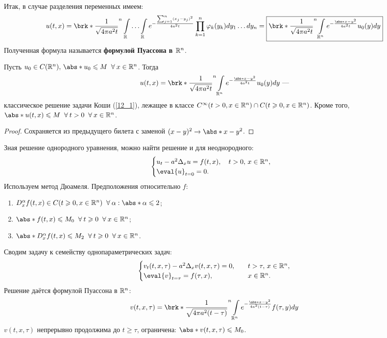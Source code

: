 Итак, в случае разделения переменных имеем:
\begin{equation}
u(t,x) = \brk*{\dfrac{1}{\sqrt{4\pi a^2t}}}^n \int\limits_\R\ldots\int\limits_\R e^{-\frac{\sum_{j=1}^n (x_j - y_j)^2}{4a^2t}} \prod_{k=1}^n \varphi_k(y_k) dy_1\ldots dy_n = \boxed{\brk*{\dfrac{1}{\sqrt{4\pi a^2 t}}}^n \int\limits_{\R^n} e^{-\frac{\abs*{x-y}^2}{4a^2t}} u_0(y)dy}
\end{equation}
Полученная формула называется {\bf формулой Пуассона в $\mathbb{R}^n$}.
\begin{theorem}
	Пусть $u_0 \in C(\R^n), \, \abs*{u_0} \leqslant M \Forall x \in \R^n$. Тогда 
    \begin{equation*}
    	u(t,x) = \brk*{\dfrac{1}{\sqrt{4\pi a^2 t}}}^n \int\limits_{\R^n} e^{-\frac{\abs*{x-y}^2}{4a^2t}} u_0(y)dy \text{ ---}
    \end{equation*}
    классическое решение задачи Коши (\ref{12_1}), лежащее в классе $C^\infty(t>0, x \in \mathbb{R}^n) \cap C(t \geqslant 0, x \in \mathbb{R}^n)$. Кроме того,~$\abs*{u(t,x)} \leqslant M \Forall t > 0 \Forall x \in \R^n$.
\end{theorem}
\begin{proof}
	Сохраняется из предыдущего билета с заменой $(x-y)^2 \to \abs*{x-y}^2$.
\end{proof}
\bigskip
Зная решение однородного уравнения, можно найти решение и для неоднородного:
\begin{equation}
	\begin{cases}
    	u_t - a^2\Delta_xu = f(t,x), \quad t > 0, \, x \in \R^n, \\
        \eval{u}_{t=0} = 0.
    \end{cases}
\end{equation}
Используем метод Дюамеля. Предположения относительно $f$:
\begin{enumerate}
	\item $D_x^\alpha f(t,x) \in C(t \geqslant 0, x \in \R^n) \Forall \alpha: \abs*{\alpha} \leqslant 2$;
    \item $\abs*{f(t,x)} \leqslant M_0 \Forall t \geqslant 0 \Forall x \in \R^n$;
    \item $\abs*{D_x^\alpha f(t,x)} \leqslant M_2 \Forall t \geqslant 0 \Forall x \in \R^n$.
\end{enumerate}
Сводим задачу к семейству однопараметрических задач:
\begin{equation}
	\begin{cases}
    	v_t(t,x,\tau) - a^2\Delta_xv(t,x,\tau) = 0, \quad & t > \tau, \, x \in \R^n, \\
        \eval{v}_{t = \tau} = f(\tau, x), \quad & x \in \R^n.
    \end{cases}
\end{equation}
Решение даётся формулой Пуассона в $\mathbb{R}^n$:
\begin{equation*}
	v(t,x,\tau) = \brk*{\dfrac{1}{\sqrt{4\pi a^2 (t - \tau)}}}^n \int\limits_{\R^n} e^{-\frac{\abs*{x-y}^2}{4a^2(t-\tau)}} f(\tau, y) dy
\end{equation*}
$v(t,x,\tau)$ непрерывно продолжима до $t \geqslant \tau$, ограничена: $\abs*{v(t,x,\tau)} \leqslant M_0$.

